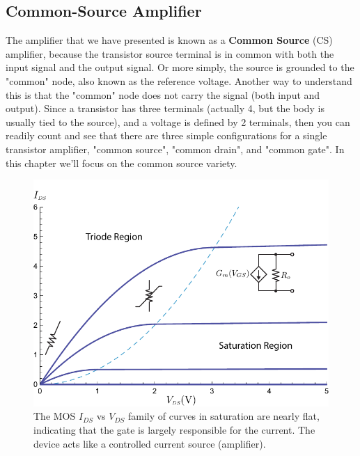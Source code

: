 \subsection{Common-Source Amplifier}
The amplifier that we have presented is known as a \textbf{Common Source} (CS) amplifier, because the transistor source terminal is in common with both the input signal and the output signal.  Or more simply, the source is grounded to the "common" node, also known as the reference voltage.  Another way to understand this is that the "common" node does not carry the signal (both input and output).  Since a transistor has three terminals (actually 4, but the body is usually tied to the source), and a voltage is defined by 2 terminals, then you can readily count and see that there are three simple configurations for a single transistor amplifier, "common source", "common drain", and "common gate".  In this chapter we'll focus on the common source variety.
\newpage
\begin{figure}[t]
\centering
\includegraphics[width=.9\columnwidth]{mos_building_block}
\caption{The MOS $I_{DS}$ vs $V_{DS}$ family of curves in saturation are nearly flat, indicating that the gate is largely responsible for the current.  The device acts like a controlled current source (amplifier).}
\label{fig:mos_building_block}
\end{figure}
